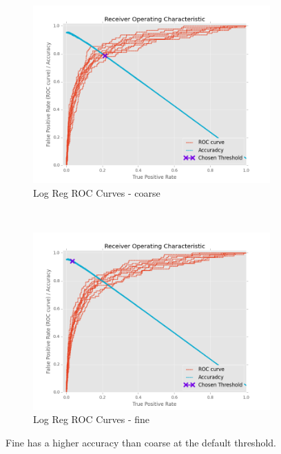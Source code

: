 \documentclass[ms]{nuthesis}
\begin{document}
\FloatBarrier
\begin{figure}[!htb]
    \centering
    \begin{subfigure}[t]{0.5\textwidth}
        \centering
        \includegraphics[width=\textwidth]{fig/LogReg_FindThreshold_RocCurve_coarse}
        \caption{Log Reg ROC Curves - coarse}
    \end{subfigure}%
    ~
    \begin{subfigure}[t]{0.5\textwidth}
        \centering
        \includegraphics[width=\textwidth]{fig/LogReg_FindThreshold_RocCurve_fine}
        \caption{Log Reg ROC Curves - fine}
    \end{subfigure}
    \caption{Fine has a higher accuracy than coarse at the default threshold.}
\end{figure}
\FloatBarrier
\end{document}
